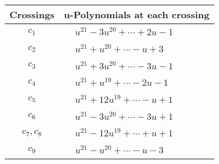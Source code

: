 \documentclass[1p]{elsarticle_modified}
\theoremstyle{definition}
\begin{document}
\begin{tabular}{m{50pt}|m{274pt}}
Crossings & \hspace{64pt}u-Polynomials at each crossing \\
\hline $$\begin{aligned}c_{1}\end{aligned}$$&$\begin{aligned}
&u^{21}-3 u^{20}+\cdots+2 u-1
\end{aligned}$\\
\hline $$\begin{aligned}c_{2}\end{aligned}$$&$\begin{aligned}
&u^{21}+u^{20}+\cdots- u+3
\end{aligned}$\\
\hline $$\begin{aligned}c_{3}\end{aligned}$$&$\begin{aligned}
&u^{21}+3 u^{20}+\cdots-3 u-1
\end{aligned}$\\
\hline $$\begin{aligned}c_{4}\end{aligned}$$&$\begin{aligned}
&u^{21}+u^{19}+\cdots-2 u-1
\end{aligned}$\\
\hline $$\begin{aligned}c_{5}\end{aligned}$$&$\begin{aligned}
&u^{21}+12 u^{19}+\cdots- u+1
\end{aligned}$\\
\hline $$\begin{aligned}c_{6}\end{aligned}$$&$\begin{aligned}
&u^{21}-3 u^{20}+\cdots-3 u+1
\end{aligned}$\\
\hline $$\begin{aligned}c_{7},c_{8}\end{aligned}$$&$\begin{aligned}
&u^{21}-12 u^{19}+\cdots+u+1
\end{aligned}$\\
\hline $$\begin{aligned}c_{9}\end{aligned}$$&$\begin{aligned}
&u^{21}- u^{20}+\cdots- u-3
\end{aligned}$\\

\end{tabular}
\end{document}
